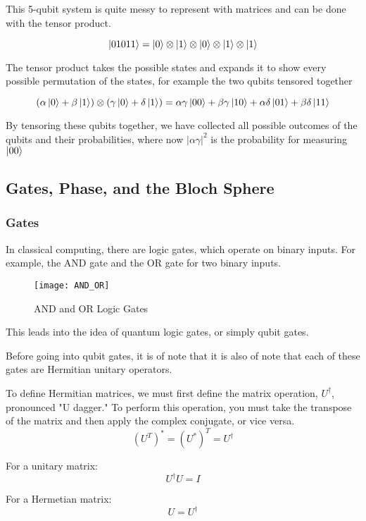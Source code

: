 \documentclass[12pt]{article}
\begin{document}
This 5-qubit system is quite messy to represent with matrices and can be done with the tensor product.

$$
\ket{01011} = \ket{0} \otimes \ket{1} \otimes \ket{0} \otimes \ket{1} \otimes \ket{1}
$$

The tensor product takes the possible states and expands it to show every possible permutation of the states, for example the two qubits tensored together

$$
(\alpha\ket{0} + \beta\ket{1}) \otimes (\gamma\ket{0} + \delta\ket{1}) = \alpha \gamma \ket{00} + \beta \gamma \ket{10} + \alpha \delta \ket{01} +\beta \delta \ket{11}
$$

By tensoring these qubits together, we have collected all possible outcomes of the qubits and their probabilities, where now $|\alpha \gamma|^2$ is the probability for measuring $\ket{00}$

\subsection{Gates, Phase, and the Bloch Sphere}

\subsubsection{Gates}

In classical computing, there are logic gates, which operate on binary inputs. For example, the AND gate and the OR gate for two binary inputs. 

\begin{figure}[h]
    \centering
    \texttt{[image: AND\_OR]}
    \caption{AND and OR Logic Gates}
    \cite{AND_OR_Logic_Gates}
    \label{fig:AND_OR}
\end{figure}

This leads into the idea of quantum logic gates, or simply qubit gates.\cite{Quantum_Information} 

Before going into qubit gates, it is of note that it is also of note that each of these gates are Hermitian unitary operators.

To define Hermitian matrices, we must first define the matrix operation, $U^\dagger$, pronounced "U dagger." To perform this operation, you must take the transpose of the matrix and then apply the complex conjugate, or vice versa.
$$
(U^{T})^{*} = (U^*)^T = U^\dagger
$$ 

For a unitary matrix:
$$
U^{\dagger}U = I
$$

For a Hermetian matrix:
$$
U = U^{\dagger}
$$
\end{document}
